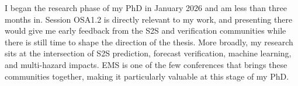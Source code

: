 \documentclass[a4paper,11pt]{article}
\begin{document}
{I began the research phase of my PhD in January 2026 and am less than three months in. Session OSA1.2 is directly relevant to my work, and presenting there would give me early feedback from the S2S and verification communities while there is still time to shape the direction of the thesis. More broadly, my research sits at the intersection of S2S prediction, forecast verification, machine learning, and multi-hazard impacts. EMS is one of the few conferences that brings these communities together, making it particularly valuable at this stage of my PhD.

}%
\end{document}
